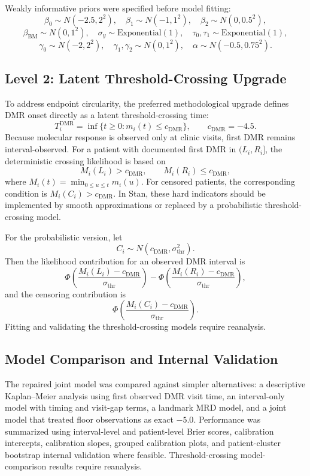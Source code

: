 Weakly informative priors were specified before model fitting:
\[
\beta_0\sim N(-2.5,2^2),\quad
\beta_1\sim N(-1,1^2),\quad
\beta_2\sim N(0,0.5^2),
\]
\[
\beta_{\mathrm{BM}}\sim N(0,1^2),\quad
\sigma_y\sim \mathrm{Exponential}(1),\quad
\tau_0,\tau_1\sim \mathrm{Exponential}(1),
\]
\[
\gamma_0\sim N(-2,2^2),\quad
\gamma_1,\gamma_2\sim N(0,1^2),\quad
\alpha\sim N(-0.5,0.75^2).
\]

\subsection{Level 2: Latent Threshold-Crossing Upgrade}

To address endpoint circularity, the preferred methodological upgrade defines DMR onset directly as a latent threshold-crossing time:
\[
T_i^{\mathrm{DMR}}=\inf\{t\ge 0:m_i(t)\le c_{\mathrm{DMR}}\},
\qquad c_{\mathrm{DMR}}=-4.5.
\]
Because molecular response is observed only at clinic visits, first DMR remains interval-observed. For a patient with documented first DMR in \((L_i,R_i]\), the deterministic crossing likelihood is based on
\[
M_i(L_i)>c_{\mathrm{DMR}}, \qquad M_i(R_i)\le c_{\mathrm{DMR}},
\]
where \(M_i(t)=\min_{0\le u\le t}m_i(u)\). For censored patients, the corresponding condition is \(M_i(C_i)>c_{\mathrm{DMR}}\). In Stan, these hard indicators should be implemented by smooth approximations or replaced by a probabilistic threshold-crossing model.

For the probabilistic version, let
\[
C_i\sim N(c_{\mathrm{DMR}},\sigma_{\mathrm{thr}}^2).
\]
Then the likelihood contribution for an observed DMR interval is
\[
\Phi\left(\frac{M_i(L_i)-c_{\mathrm{DMR}}}{\sigma_{\mathrm{thr}}}\right)
-
\Phi\left(\frac{M_i(R_i)-c_{\mathrm{DMR}}}{\sigma_{\mathrm{thr}}}\right),
\]
and the censoring contribution is
\[
\Phi\left(\frac{M_i(C_i)-c_{\mathrm{DMR}}}{\sigma_{\mathrm{thr}}}\right).
\]
Fitting and validating the threshold-crossing models require reanalysis.

\subsection{Model Comparison and Internal Validation}

The repaired joint model was compared against simpler alternatives: a descriptive Kaplan--Meier analysis using first observed DMR visit time, an interval-only model with timing and visit-gap terms, a landmark MRD model, and a joint model that treated floor observations as exact \(-5.0\). Performance was summarized using interval-level and patient-level Brier scores, calibration intercepts, calibration slopes, grouped calibration plots, and patient-cluster bootstrap internal validation where feasible. Threshold-crossing model-comparison results require reanalysis.

